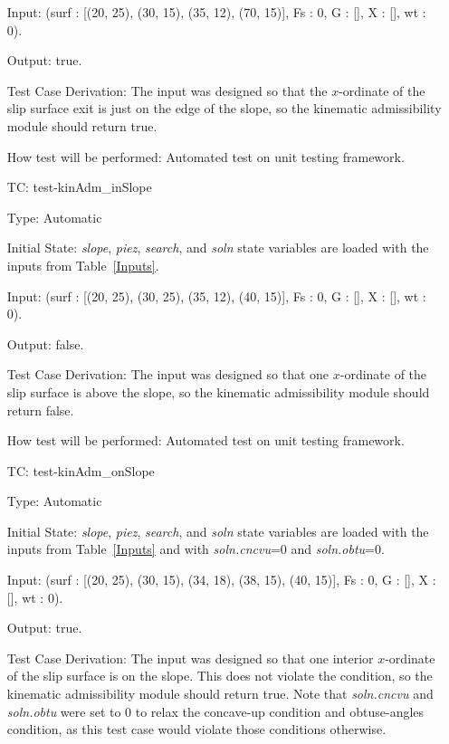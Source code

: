 \documentclass[12pt, titlepage]{article}
\newcounter{utestnum} %
\begin{document}
\begin{enumerate}[label=TC\arabic*:,ref={\arabic*}]
	Input: (surf : [(20, 25), (30, 15), (35, 12), (70, 15)], Fs : 0, G : [], X 
	: [], wt : 0).
	
	Output: true.
	
	Test Case Derivation: The input was designed so that the $x$-ordinate of 
	the slip surface exit is just on the edge of the slope, so the kinematic 
	admissibility module should return true.
	
	How test will be performed: Automated test on unit testing framework.
	
	\item [TC\refstepcounter{utestnum}\theutestnum: \label{TC_KinAdmInSlope}] 
	test-kinAdm\_inSlope
	
	Type: Automatic
	
	Initial State: \textit{slope}, \textit{piez}, \textit{search}, and 
	\textit{soln} state variables are loaded with the inputs from 
	Table~\ref{Inputs}.
	
	Input: (surf : [(20, 25), (30, 25), (35, 12), (40, 15)], Fs : 0, G : [], X 
	: [], wt : 0).
	
	Output: false.
	
	Test Case Derivation: The input was designed so that one $x$-ordinate of 
	the slip surface is above the slope, so the kinematic admissibility module 
	should return false.
	
	How test will be performed: Automated test on unit testing framework.
	
	\item [TC\refstepcounter{utestnum}\theutestnum: \label{TC_KinAdmOnSlope}] 
	test-kinAdm\_onSlope
	
	Type: Automatic
	
	Initial State: \textit{slope}, \textit{piez}, \textit{search}, and 
	\textit{soln} state variables are loaded with the inputs from 
	Table~\ref{Inputs} and with \textit{soln.cncvu}=0 and \textit{soln.obtu}=0.
	
	Input: (surf : [(20, 25), (30, 15), (34, 18), (38, 15), (40, 15)], Fs : 0, 
	G : [], X : [], wt : 0).
	
	Output: true.
	
	Test Case Derivation: The input was designed so that one interior 
	$x$-ordinate of the slip surface is on the slope. This does not violate the 
	condition, so the kinematic admissibility module should return true. Note 
	that \textit{soln.cncvu} and \textit{soln.obtu} were set to 0 to relax the 
	concave-up condition and obtuse-angles condition, as this test case would 
	violate those conditions otherwise.
	

\end{enumerate}
\end{document}
